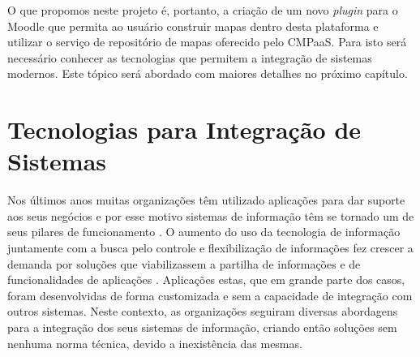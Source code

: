 \documentclass[
	12pt,				%
	openright,			%
	oneside,			%
	a4paper,			%
	english,			%
	french,				%
	spanish,			%
	brazil				%
	]{abntex2}
\begin{document}
O que propomos neste projeto é, portanto, a criação de um novo \textit{plugin} para o Moodle que permita ao usuário construir mapas dentro desta plataforma e utilizar o serviço de repositório de mapas oferecido pelo CMPaaS. Para isto será necessário conhecer as tecnologias que permitem a integração de sistemas modernos. Este tópico será abordado com maiores detalhes no próximo capítulo.  

\begin{table}[htb]
\end{table}




\chapter{Tecnologias para Integração de Sistemas}

Nos últimos anos muitas organizações têm utilizado aplicações para dar suporte aos seus negócios e por esse motivo sistemas de informação têm se tornado um de seus pilares de funcionamento \cite{martins2006integraccao}. O aumento do uso da tecnologia de informação juntamente com a busca pelo controle e flexibilização de informações fez crescer a demanda por soluções que viabilizassem a partilha de informações e de funcionalidades de aplicações \cite{edwards2000application}. Aplicações estas, que em grande parte dos casos, foram desenvolvidas de forma customizada e sem a capacidade de integração com outros sistemas. Neste contexto, as organizações seguiram diversas abordagens para a integração dos seus sistemas de informação, criando então soluções sem nenhuma norma técnica, devido a inexistência das mesmas. 
\end{document}
